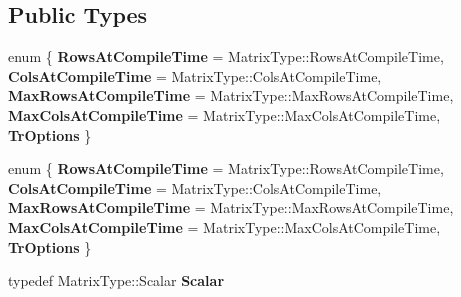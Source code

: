 \subsection*{Public Types}
\begin{DoxyCompactItemize}
\item 
\mbox{\label{class_eigen_1_1internal_1_1qr__preconditioner__impl_3_01_matrix_type_00_01_full_piv_householder_0bfd000ff4c8127883e77da4144b4435_a3a650f978fed62852977438a8500328b}} 
enum \{ \newline
{\bfseries Rows\+At\+Compile\+Time} = Matrix\+Type\+:\+:Rows\+At\+Compile\+Time, 
{\bfseries Cols\+At\+Compile\+Time} = Matrix\+Type\+:\+:Cols\+At\+Compile\+Time, 
{\bfseries Max\+Rows\+At\+Compile\+Time} = Matrix\+Type\+:\+:Max\+Rows\+At\+Compile\+Time, 
{\bfseries Max\+Cols\+At\+Compile\+Time} = Matrix\+Type\+:\+:Max\+Cols\+At\+Compile\+Time, 
\newline
{\bfseries Tr\+Options}
 \}
\item 
\mbox{\label{class_eigen_1_1internal_1_1qr__preconditioner__impl_3_01_matrix_type_00_01_full_piv_householder_0bfd000ff4c8127883e77da4144b4435_addcca925cb73ad202e5174b3e6b22f60}} 
enum \{ \newline
{\bfseries Rows\+At\+Compile\+Time} = Matrix\+Type\+:\+:Rows\+At\+Compile\+Time, 
{\bfseries Cols\+At\+Compile\+Time} = Matrix\+Type\+:\+:Cols\+At\+Compile\+Time, 
{\bfseries Max\+Rows\+At\+Compile\+Time} = Matrix\+Type\+:\+:Max\+Rows\+At\+Compile\+Time, 
{\bfseries Max\+Cols\+At\+Compile\+Time} = Matrix\+Type\+:\+:Max\+Cols\+At\+Compile\+Time, 
\newline
{\bfseries Tr\+Options}
 \}
\item 
\mbox{\label{class_eigen_1_1internal_1_1qr__preconditioner__impl_3_01_matrix_type_00_01_full_piv_householder_0bfd000ff4c8127883e77da4144b4435_ab4614d310274ec672b10bf51fee7caf5}} 
typedef Matrix\+Type\+::\+Scalar {\bfseries Scalar}
\item 
\mbox{\label{class_eigen_1_1internal_1_1qr__preconditioner__impl_3_01_matrix_type_00_01_full_piv_householder_0bfd000ff4c8127883e77da4144b4435_a1b7fe65d1a64c063e03f968ac201fc1a}} 

\end{DoxyCompactItemize}
